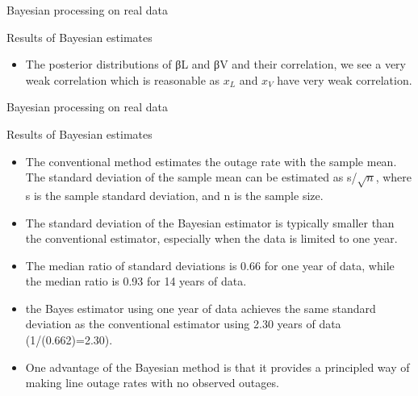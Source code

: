 \documentclass{beamer}
\begin{document}
\begin{frame}{Bayesian processing on real data}
\begin{block}{Results of Bayesian estimates}
\begin{itemize}
  \item
The posterior distributions of βL and βV and their correlation, we see a very weak correlation which is reasonable as $x_L$ and $x_V$ have very weak correlation.
\end{itemize}
\end{block}
\begin{figure}
    \centering
    \qquad
    \label{fig:example}
\end{figure}
\end{frame}


\begin{frame}{Bayesian processing on real data}
\begin{block}{Results of Bayesian estimates}
\begin{itemize}
  \item The conventional method estimates the
outage rate with the sample mean. The standard deviation of the
sample mean can be estimated as s/$\sqrt{n}$, where s is the sample
standard deviation, and n is the sample size.
\item The standard
deviation of the Bayesian estimator is typically smaller than the
conventional estimator, especially when the data is limited to
one year. 
\item The median ratio of standard deviations is 0.66 for one
year of data, while the median ratio is 0.93 for 14 years of data.
\item the Bayes estimator using one year of data achieves the
same standard deviation as the conventional estimator using
2.30 years of data (1/(0.662)=2.30). 
\item One advantage of the Bayesian method is that it provides a
principled way of making line outage rates with no observed
outages.
\end{itemize}
\end{block}
\end{frame}
\end{document}
